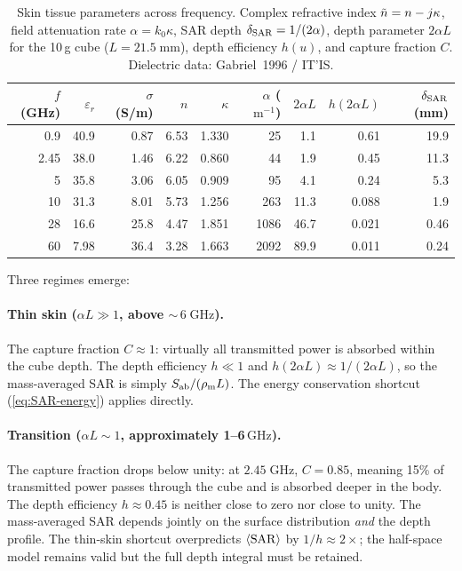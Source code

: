 \begin{table}[ht]
\centering
\caption{Skin tissue parameters across frequency.  Complex refractive
  index $\tilde{n} = n - j\kappa$, field attenuation rate
  $\alpha = k_0 \kappa$, SAR depth
  $\delta_{\mathrm{SAR}} = 1/(2\alpha)$, depth parameter $2\alpha L$ for the
  10\,g cube ($L = 21.5\;\mathrm{mm}$), depth efficiency $h(u)$, and
  capture fraction $C$.  Dielectric data: Gabriel~1996 /
  IT'IS.}
\label{tab:skin-freq}
\begin{tabular}{@{}r r r r r r r r r@{}}
\toprule
$f$ (GHz) & $\varepsilon_r$ & $\sigma$ (S/m) & $n$ & $\kappa$
  & $\alpha$ ($\mathrm{m^{-1}}$) & $2\alpha L$ & $h(2\alpha L)$ & $\delta_{\mathrm{SAR}}$ (mm) \\
\midrule
0.9  & 40.9 & 0.87  & 6.53 & 1.330 &   25  &  1.1 & 0.61 & 19.9 \\
2.45 & 38.0 & 1.46  & 6.22 & 0.860 &   44  &  1.9 & 0.45 & 11.3 \\
5    & 35.8 & 3.06  & 6.05 & 0.909 &   95  &  4.1 & 0.24 &  5.3 \\
10   & 31.3 & 8.01  & 5.73 & 1.256 &  263  & 11.3 & 0.088 &  1.9 \\
28   & 16.6 & 25.8  & 4.47 & 1.851 & 1086  & 46.7 & 0.021 &  0.46 \\
60   &  7.98 & 36.4 & 3.28 & 1.663 & 2092  & 89.9 & 0.011 &  0.24 \\
\bottomrule
\end{tabular}
\end{table}

\noindent
Three regimes emerge:

\paragraph{Thin skin ($\alpha L \gg 1$, above ${\sim}\,6\;\mathrm{GHz}$).}
The capture fraction $C \approx 1$: virtually all transmitted power is
absorbed within the cube depth.  The depth efficiency $h \ll 1$ and
$h(2\alpha L) \approx 1/(2\alpha L)$, so the mass-averaged SAR is simply
$S_{\mathrm{ab}}/(\rho_{\mathrm{m}} L)$.  The energy conservation shortcut
(\cref{eq:SAR-energy}) applies directly.

\paragraph{Transition ($\alpha L \sim 1$, approximately
  1--6\,$\mathrm{GHz}$).}
The capture fraction drops below unity: at
$2.45\;\mathrm{GHz}$, $C = 0.85$, meaning 15\% of transmitted power
passes through the cube and is absorbed deeper in the body.  The depth
efficiency $h \approx 0.45$ is neither close to zero nor close to unity.
The mass-averaged SAR depends jointly on the surface distribution
\emph{and} the depth profile.  The thin-skin shortcut overpredicts
$\langle\mathrm{SAR}\rangle$ by $1/h \approx 2\times$; the half-space model
remains valid but the full depth integral must be retained.

